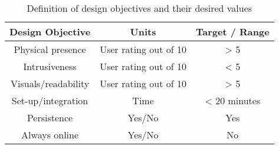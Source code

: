 \begin{table}[!h]
\begin{center}
\begin{tabular}{|c|c|c|}
\hline
  Design Objective & Units & Target / Range \\
\hline
\hline
  Physical presence & User rating out of 10 & > 5 \\
\hline
  Intrusiveness & User rating out of 10 & < 5 \\
\hline
  Visuals/readability & User rating out of 10 & > 5 \\
\hline
  Set-up/integration & Time & < 20 minutes \\
\hline
  Persistence & Yes/No & Yes \\
\hline
  Always online & Yes/No & No \\
\hline
\end{tabular}
\caption{Definition of design objectives and their desired values}
\label{table:desobj_tbl}
\end{center}
\end{table}
